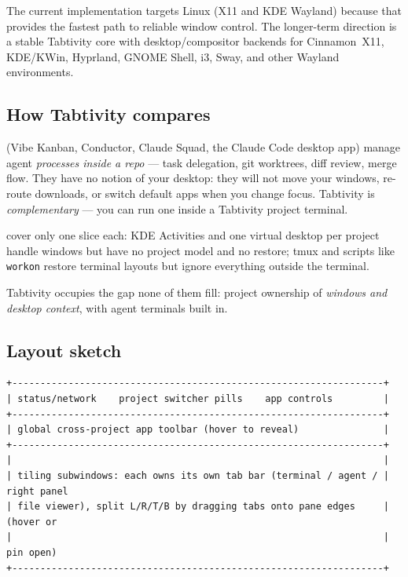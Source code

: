 \documentclass[11pt,a4paper]{article}
\newcommand{\code}[1]{\texttt{#1}}
\begin{document}
The current implementation targets Linux (X11 and KDE Wayland) because that
provides the fastest path to reliable window control. The longer-term direction
is a stable Tabtivity core with desktop/compositor backends for Cinnamon~X11,
KDE/KWin, Hyprland, GNOME Shell, i3, Sway, and other Wayland environments.

\subsection{How Tabtivity compares}

\begin{description}[leftmargin=1.2em,style=nextline]
  \item[Agent orchestrators] (Vibe Kanban, Conductor, Claude Squad, the Claude
  Code desktop app) manage agent \emph{processes inside a repo} --- task
  delegation, git worktrees, diff review, merge flow. They have no notion of
  your desktop: they will not move your windows, re-route downloads, or switch
  default apps when you change focus. Tabtivity is \emph{complementary} --- you can
  run one inside a Tabtivity project terminal.
  \item[Manual approaches] cover only one slice each: KDE Activities and one
  virtual desktop per project handle windows but have no project model and no
  restore; tmux and scripts like \code{workon} restore terminal layouts but
  ignore everything outside the terminal.
\end{description}

Tabtivity occupies the gap none of them fill: project ownership of \emph{windows
and desktop context}, with agent terminals built in.

\subsection{Layout sketch}

\begin{lstlisting}
+------------------------------------------------------------------+
| status/network    project switcher pills    app controls         |
+------------------------------------------------------------------+
| global cross-project app toolbar (hover to reveal)               |
+------------------------------------------------------------------+
|                                                                  |
| tiling subwindows: each owns its own tab bar (terminal / agent / | right panel
| file viewer), split L/R/T/B by dragging tabs onto pane edges     | (hover or
|                                                                  |  pin open)
+------------------------------------------------------------------+
\end{lstlisting}
\end{document}
